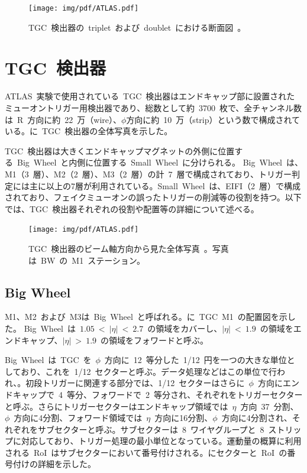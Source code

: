 \begin{figure}[H]
        \centering   
        \texttt{[image: img/pdf/ATLAS.pdf]}
        \caption[TGC~検出器の~triplet~および~doublet~における断面図]{TGC~検出器の~triplet~および~doublet~における断面図~\cite{TR:01}。}\label{fig:TGCpri}
\end{figure}

\section{TGC~検出器}
ATLAS~実験で使用されている~TGC~検出器はエンドキャップ部に設置されたミューオントリガー用検出器であり、総数として約~3700~枚で、全チャンネル数は~R~方向に約~22~万（wire）、$\phi$方向に約~10~万（strip）という数で構成されている。に~TGC~検出器の全体写真を示した。

TGC~検出器は大きくエンドキャップマグネットの外側に位置する~Big~Wheel~と内側に位置する~Small~Wheel~に分けられる。
Big~Wheel~は、M1（3~層）、M2（2~層）、M3（2~層）の計~7~層で構成されており、トリガー判定には主に以上の7層が利用されている。Small~Wheel~は、EIFI（2~層）で構成されており、フェイクミューオンの誤ったトリガーの削減等の役割を持つ。以下では、TGC~検出器それぞれの役割や配置等の詳細について述べる。

\begin{figure}[H]
    \centering   
    \texttt{[image: img/pdf/ATLAS.pdf]}
    \caption[TGC 検出器のビーム軸方向から見た全体写真]{TGC~検出器のビーム軸方向から見た全体写真~\cite{TR:01}。写真は~BW~の~M1~ステーション。}\label{fig:tgc00}
\end{figure}

\subsection{Big Wheel}
M1、M2~および~M3は~Big~Wheel~と呼ばれる。に~TGC~M1~の配置図を示した。
Big~Wheel~は~$1.05~<~|\eta|~<~2.7$~の領域をカバーし、$|\eta|~<~1.9$~の領域をエンドキャップ、$|\eta|~>~1.9$~の領域をフォワードと呼ぶ。

Big~Wheel~は~TGC~を~$\phi$~方向に~12~等分した~1/12~円を一つの大きな単位としており、これを~1/12~セクターと呼ぶ。データ処理などはこの単位で行われ、。初段トリガーに関連する部分では、1/12~セクターはさらに~$\phi$~方向にエンドキャップで~4~等分、フォワードで~2~等分され、それぞれをトリガーセクターと呼ぶ。さらにトリガーセクターはエンドキャップ領域では~$\eta$~方向~37~分割、$\phi$~方向に4分割、フォワード領域では~$\eta$~方向に16分割、$\phi$~方向に4分割され、それぞれをサブセクターと呼ぶ。サブセクターは~8~ワイヤグループと~8~ストリップに対応しており、トリガー処理の最小単位となっている。運動量の概算に利用される~RoI~はサブセクターにおいて番号付けされる。にセクターと~RoI~の番号付けの詳細を示した。

